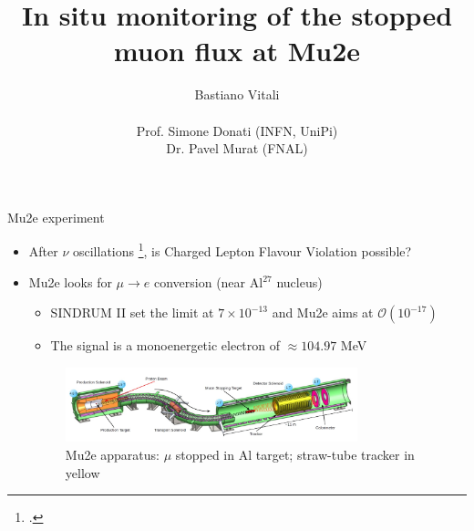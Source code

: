 \documentclass[10pt]{beamer}
\author[Bastiano Vitali]{{\Large Bastiano Vitali}\\\ \\{\small Prof. Simone Donati (INFN, UniPi)\\ Dr. Pavel Murat (FNAL)}}
\title{In situ monitoring of the stopped muon flux at Mu2e}
\date{}
\begin{document}
\begin{frame}
\titlepage
\end{frame}

\begin{frame}{Mu2e experiment}
\begin{itemize}
\item After $\nu$ oscillations \footcite{signorelli}, is Charged Lepton Flavour Violation possible?\\
\item Mu2e looks for $\mu\rightarrow e$ conversion (near Al$^{27}$ nucleus)
\begin{itemize}
\item SINDRUM II set the limit at $7\times 10^{-13}$ and Mu2e aims at $\mathcal{O}(10^{-17})$
\item The signal is a monoenergetic electron of $ \approx 104.97$ MeV
\end{itemize}
\begin{figure}
\centering
\includegraphics[width=0.8\textwidth]{mu2e_apparatus}
\caption{Mu2e apparatus: $\mu$ stopped in Al target; straw-tube tracker in yellow}
\end{figure}
\end{itemize}
\end{frame}
\end{document}
